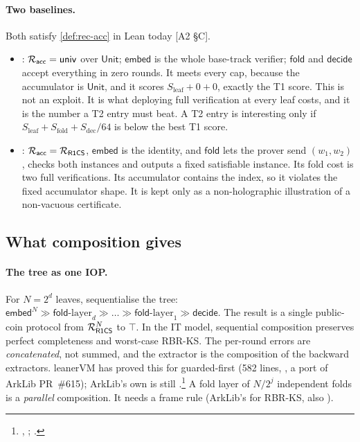 \paragraph{Two baselines.} Both satisfy \cref{def:rec-acc} in Lean today [A2 §C].
\begin{itemize}[nosep]
\item {}: $\mathcal{R}_{\mathsf{acc}}=\mathsf{univ}$ over $\mathsf{Unit}$; $\mathsf{embed}$ is the whole
  base-track verifier; $\mathsf{fold}$ and $\mathsf{decide}$ accept everything in zero rounds. It
  meets every cap, because the accumulator is $\mathsf{Unit}$, and it scores
  $S_{\mathrm{leaf}}+0+0$, exactly the T1 score. This is not an exploit. It is what deploying full
  verification at every leaf costs, and it is the number a T2 entry must beat. A T2 entry is
  interesting only if $S_{\mathrm{leaf}}+S_{\mathrm{fold}}+S_{\mathrm{dec}}/64$ is below the best T1
  score.
\item {}: $\mathcal{R}_{\mathsf{acc}}=\mathcal{R}_{\mathsf{R1CS}}$, $\mathsf{embed}$ is the identity, and $\mathsf{fold}$ lets
  the prover send $(w_1,w_2)$, checks both instances and outputs a fixed satisfiable instance. Its
  fold cost is two full verifications. Its accumulator contains the index, so it violates the fixed
  accumulator shape. It is kept only as a non-holographic illustration of a non-vacuous certificate.
\end{itemize}

\subsection{What composition gives}\label{subsec:rec-compose}

\paragraph{The tree as one IOP.} For $N=2^d$ leaves, sequentialise the tree:
$\mathsf{embed}^{N}\gg\mathsf{fold}\text{-layer}_d\gg\dots\gg\mathsf{fold}\text{-layer}_1\gg
\mathsf{decide}$. The result is a single public-coin protocol from $\mathcal{R}_{\mathsf{R1CS}}^{N}$ to $\top$. In the IT
model, sequential composition preserves perfect completeness and worst-case RBR-KS. The per-round
errors are \emph{concatenated}, not summed, and the extractor is the composition of the backward
extractors. leanerVM has proved this for guarded-first  (582 lines,
, a port of ArkLib PR~\#615); ArkLib's own
 is still 
\cite{arklib2026}.\footnote{, ;
.} A fold layer of
$N/2^j$ independent folds is a \emph{parallel} composition. It needs a frame rule (ArkLib's
 for RBR-KS, also ).

